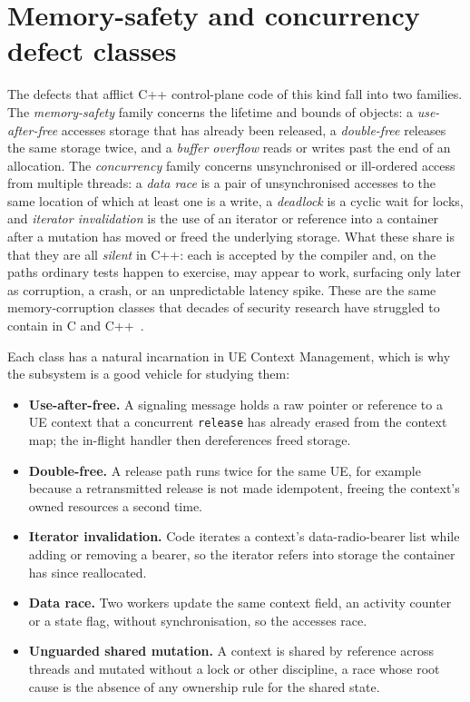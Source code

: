 \documentclass[english,twoside,openright,a4paper,censored,csm,software-track-2020]{HYthesisML}
\begin{document}
\section{Memory-safety and concurrency defect classes}
The defects that afflict C++ control-plane code of this kind fall into two families. The
\emph{memory-safety} family concerns the lifetime and bounds of objects: a \emph{use-after-free}
accesses storage that has already been released, a \emph{double-free} releases the same storage
twice, and a \emph{buffer overflow} reads or writes past the end of an allocation. The
\emph{concurrency} family concerns unsynchronised or ill-ordered access from multiple threads: a
\emph{data race} is a pair of unsynchronised accesses to the same location of which at least one
is a write, a \emph{deadlock} is a cyclic wait for locks, and \emph{iterator invalidation} is
the use of an iterator or reference into a container after a mutation has moved or freed the
underlying storage. What these share is that they are all \emph{silent} in C++: each is accepted
by the compiler and, on the paths ordinary tests happen to exercise, may appear to work,
surfacing only later as corruption, a crash, or an unpredictable latency spike. These are the
same memory-corruption classes that decades of security research have struggled to contain in C
and C++~\cite{szekeres2013sok}.

Each class has a natural incarnation in UE Context Management, which is why the subsystem is a
good vehicle for studying them:

\begin{itemize}
  \item \textbf{Use-after-free.} A signaling message holds a raw pointer or reference to a UE
        context that a concurrent \texttt{release} has already erased from the context map; the
        in-flight handler then dereferences freed storage.
  \item \textbf{Double-free.} A release path runs twice for the same UE, for example because a
        retransmitted release is not made idempotent, freeing the context's owned resources a
        second time.
  \item \textbf{Iterator invalidation.} Code iterates a context's data-radio-bearer list while
        adding or removing a bearer, so the iterator refers into storage the container has since
        reallocated.
  \item \textbf{Data race.} Two workers update the same context field, an activity counter or a
        state flag, without synchronisation, so the accesses race.
  \item \textbf{Unguarded shared mutation.} A context is shared by reference across threads and
        mutated without a lock or other discipline, a race whose root cause is the absence of any
        ownership rule for the shared state.
\end{itemize}
\end{document}
